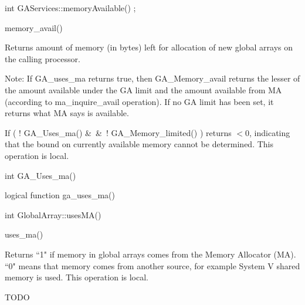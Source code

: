 \documentclass[12pt]{article}
\begin{document}
\begin{cxxapi}
\begin{cxxcode}
int GAServices::memoryAvailable() ;
\end{cxxcode}
\end{cxxapi}

\begin{pyapi}
\begin{pycode}
memory_avail() 
\end{pycode}
\end{pyapi}


\begin{desc}

Returns amount of memory (in bytes) left for allocation of new global
arrays on the calling processor.

Note: If GA_uses_ma returns true, then GA_Memory_avail returns the lesser 
of the amount available under the GA limit and the amount available from MA 
(according to ma_inquire_avail operation). If no GA limit has been set, it 
returns what MA says is available.

If ( ! GA_Uses_ma() \&\ \&\ ! GA_Memory_limited() ) returns $< 0$, indicating 
that the bound on currently available memory cannot be determined.
This operation is local.
\end{desc}


\begin{capi}
\begin{ccode}
int GA_Uses_ma()
\end{ccode}
\end{capi}

\begin{fapi}
\begin{fcode}
logical function ga_uses_ma()
\end{fcode}
\end{fapi}

\begin{cxxapi}
\begin{cxxcode}
int GlobalArray::usesMA()
\end{cxxcode}
\end{cxxapi}

\begin{pyapi}
\begin{pycode}
uses_ma()
\end{pycode}
\end{pyapi} 
 

\begin{desc}

Returns ``1" if memory in global arrays comes from the Memory Allocator (MA). 
``0" means that memory comes from another source, for example System V shared 
memory is used.
This operation is local.

TODO
\end{desc}
\end{document}
